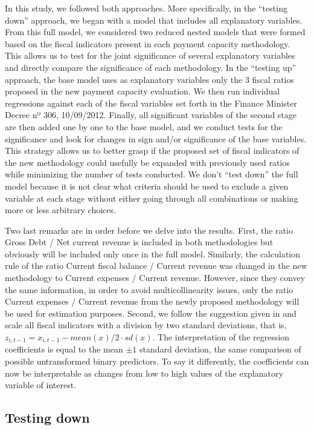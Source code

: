 In this study, we followed both approaches. More specifically, in the ``testing down'' approach, we began with a model that includes all explanatory variables. From this full model, we considered two reduced nested models that were formed based on the fiscal indicators present in each payment capacity methodology. This allows us to test for the joint significance of several explanatory variables and directly compare the significance of each methodology. In the ``testing up'' approach, the base model uses as explanatory variables only the $3$ fiscal ratios proposed in the new payment capacity evaluation. We then run individual regressions against each of the fiscal variables set forth in the Finance Minister Decree nº 306, 10/09/2012. Finally, all significant variables of the second stage are then added one by one to the base model, and we conduct tests for the significance and look for changes in sign and/or significance of the base variables. This strategy allows us to better grasp if the proposed set of fiscal indicators of the new methodology could usefully be expanded with previously used ratios while minimizing the number of tests conducted. We don't ``test down'' the full model because it is not clear what criteria should be used to exclude a given variable at each stage without either going through all combinations or making more or less arbitrary choices.

Two last remarks are in order before we delve into the results. First, the ratio Gross Debt / Net current revenue is included in both methodologies but obviously will be included only once in the full model. Similarly, the calculation rule of the ratio Current fiscal balance / Current revenue was changed in the new methodology to Current expenses / Current revenue. However, since they convey the same information, in order to avoid multicollinearity issues, only the ratio Current expenses / Current revenue from the newly proposed methodology will be used for estimation purposes. Second, we follow the suggestion given in \citet{gelman2008} and scale all fiscal indicators with a division by two standard deviations, that is, $z_{i,t-1} = x_{i, t-1} - mean(x) / 2 \cdot sd(x)$. The interpretation of the regression coefficients is equal to the mean $\pm 1$ standard deviation, the same comparison of possible untransformed binary predictors. To say it differently, the coefficients can now be interpretable as changes from low to high values of the explanatory variable of interest.

\subsection*{Testing down}

